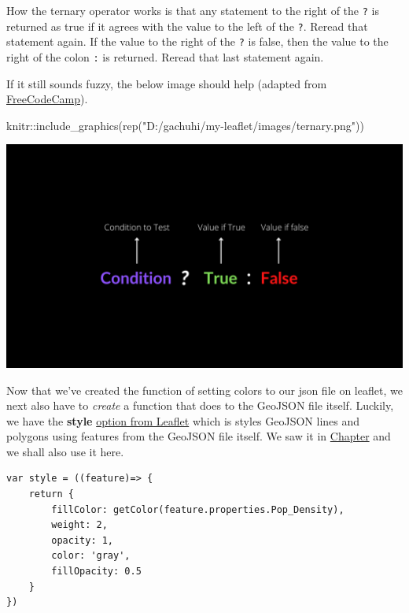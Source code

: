 \documentclass[
]{book}
\newenvironment{Shaded}{\begin{snugshade}}{\end{snugshade}}
\newcommand{\FunctionTok}[1]{\textcolor[rgb]{0.00,0.00,0.00}{#1}}
\newcommand{\NormalTok}[1]{#1}
\newcommand{\SpecialCharTok}[1]{\textcolor[rgb]{0.00,0.00,0.00}{#1}}
\newcommand{\StringTok}[1]{\textcolor[rgb]{0.31,0.60,0.02}{#1}}
\begin{document}
How the ternary operator works is that any statement to the right of the \texttt{?} is returned as true if it agrees with the value to the left of the \texttt{?}. Reread that statement again. If the value to the right of the \texttt{?} is false, then the value to the right of the colon \texttt{:} is returned. Reread that last statement again.

If it still sounds fuzzy, the below image should help (adapted from \href{https://www.freecodecamp.org/news/how-the-question-mark-works-in-javascript/}{FreeCodeCamp}).

\begin{Shaded}
\begin{Highlighting}[]
\NormalTok{knitr}\SpecialCharTok{::}\FunctionTok{include\_graphics}\NormalTok{(}\FunctionTok{rep}\NormalTok{(}\StringTok{"D:/gachuhi/my{-}leaflet/images/ternary.png"}\NormalTok{))}
\end{Highlighting}
\end{Shaded}

\includegraphics[width=22.22in]{../images/ternary}

Now that we've created the function of setting colors to our json file on leaflet, we next also have to \emph{create} a function that does to the GeoJSON file itself. Luckily, we have the \textbf{style} \href{https://leafletjs.com/reference.html\#geojson-style}{option from Leaflet} which is styles GeoJSON lines and polygons using features from the GeoJSON file itself. We saw it in \protect\hyperlink{using-geojson-in-leaflet}{Chapter} and we shall also use it here.

\begin{verbatim}
var style = ((feature)=> {
    return {
        fillColor: getColor(feature.properties.Pop_Density),
        weight: 2,
        opacity: 1,
        color: 'gray',
        fillOpacity: 0.5
    }
})
\end{verbatim}
\end{document}
